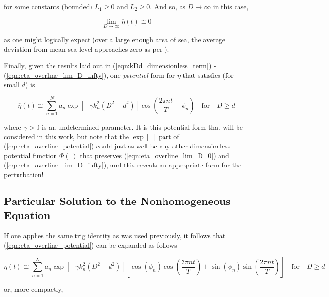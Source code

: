 \noindent for some constants (bounded) $L_1\geq 0$ and $L_2\geq 0$. And so, as $D\to\infty$ in this case,

\begin{equation}
	\lim_{D\to\infty}\overline{\eta}(t)\cong 0
	\label{eqn:eta_overline_lim_D_infty}
\end{equation}

\noindent as one might logically expect (over a large enough area of sea, the average deviation from mean sea level approaches zero as per \cite{Holthuijsen_2010}).\par 
Finally, given the results laid out in (\ref{eqn:kDd_dimensionless_term}) - (\ref{eqn:eta_overline_lim_D_infty}), one \textit{potential} form for $\overline{\eta}$ that satisfies (for small $d$) is

\begin{equation}
	\overline{\eta}(t)\cong \sum_{n=1}^{N} a_n\exp\left[-\gamma k_n^2(D^2 - d^2)\right]\cos\left(\frac{2\pi nt}{T} - \phi_n\right)\quad\textrm{for}\quad D\geq d
	\label{eqn:eta_overline_potential}
\end{equation}

\noindent where $\gamma>0$ is an undetermined parameter. It is this potential form that will be considered in this work, but note that the $\exp[\;]$ part of (\ref{eqn:eta_overline_potential}) could just as well be any other dimensionless potential function $\Phi(\;)$ that preserves (\ref{eqn:eta_overline_lim_D_0}) and (\ref{eqn:eta_overline_lim_D_infty}), and this reveals an appropriate form for the perturbation!

\subsection{Particular Solution to the Nonhomogeneous Equation}

If one applies the same trig identity as was used previously, it follows that (\ref{eqn:eta_overline_potential}) can be expanded as follows

\begin{equation}
	\overline{\eta}(t) \cong \sum_{n=1}^{N} a_n\exp[-\gamma k_n^2(D^2 - d^2)]\left[\cos(\phi_n)\cos\left(\frac{2\pi nt}{T}\right) + \sin(\phi_n)\sin\left(\frac{2\pi nt}{T}\right)\right]\quad\textrm{for}\quad D\geq d
	\label{eqn:eta_overline_potential_expanded}
\end{equation}

\noindent or, more compactly,

